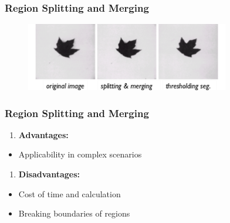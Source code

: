 \documentclass[notheorems,mathserif,table,compress]{beamer}  %
\begin{document}
\begin{frame}
  \frametitle{Region Splitting and Merging}
  \begin{figure}[!ht]
  \centering\includegraphics[width=3.5in]{region2.png}
  \end{figure} 
\end{frame}

\begin{frame}
    \frametitle{Region Splitting and Merging}
    \begin{enumerate}[{\color{black}{\Large (C)}}]
    \item  \textbf{\Large Advantages:}
    \end{enumerate}
        \begin{itemize}
	\item Applicability in complex scenarios
        \end{itemize}
    \begin{enumerate}[]
    \item  \hspace{0.25in}\textbf{\Large Disadvantages:}
    \end{enumerate}
        \begin{itemize}
        \item Cost of time and calculation
        \item Breaking boundaries of regions
    \end{itemize}
\end{frame}

\end{document}
